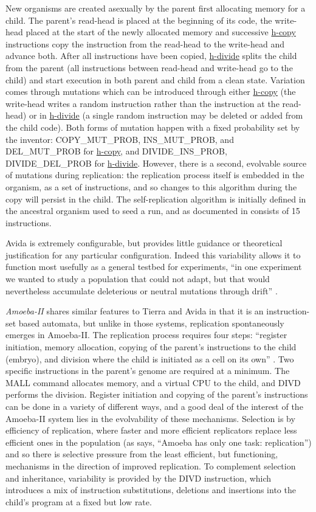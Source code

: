 New organisms are created asexually by the parent first allocating memory for a child. The parent's read-head is placed at the beginning of its code, the write-head placed at the start of the newly allocated memory and successive \url{h-copy} instructions copy the instruction from the read-head to the write-head and advance both. After all instructions have been copied, \url{h-divide} splits the child from the parent (all instructions between read-head and write-head go to the child) and start execution in both parent and child from a clean state. Variation comes through mutations which can be introduced through either \url{h-copy} (the write-head writes a random instruction rather than the instruction at the read-head) or in \url{h-divide} (a single random instruction may be deleted or added from the child code). Both forms of mutation happen with a fixed probability set by the inventor: COPY\_MUT\_PROB, INS\_MUT\_PROB, and DEL\_MUT\_PROB for \url{h-copy}, and DIVIDE\_INS\_PROB, DIVIDE\_DEL\_PROB for \url{h-divide}. However, there is a second, evolvable source of mutations during replication: the replication process itself is embedded in the organism, as a set of instructions, and so changes to this algorithm during the copy will persist in the child. The self-replication algorithm is initially defined in the ancestral organism used to seed a run, and as documented in \textcite[A1.3]{Ofria2004} consists of 15 instructions.

Avida is extremely configurable, but provides little guidance or theoretical justification for any particular configuration. Indeed this variability allows it to function most usefully as a general testbed for experiments, \eg ``in one experiment we wanted to study a population that could not adapt, but that would nevertheless accumulate deleterious or neutral mutations through drift'' \parencite{Ofria2004}.

\emph{Amoeba-II} \parencite{Pargellis2001} shares similar features to Tierra and Avida in that it is an instruction-set based automata, but unlike in those systems, replication spontaneously emerges in Amoeba-II. The replication process requires four steps: ``register initiation, memory allocation, copying of the parent's instructions to the child (embryo), and division where the child is initiated as a cell on its own'' \parencite[p.69]{Pargellis2001}. Two specific instructions in the parent's genome are required at a minimum. The MALL command allocates memory, and a virtual CPU to the child, and DIVD performs the division. Register initiation and copying of the parent's instructions can be done in a variety of different ways, and a good deal of the interest of the Amoeba-II system lies in the evolvability of these mechanisms. Selection is by efficiency of replication, where faster and more efficient replicators replace less efficient ones in the population (as \textcite{Pargellis2001} says, ``Amoeba has only one task: replication'') and so there is selective pressure from the least efficient, but functioning, mechanisms in the direction of improved replication. To complement selection and inheritance, variability is provided by the DIVD instruction, which introduces a mix of instruction substitutions, deletions and insertions into the child's program at a fixed but low rate.

